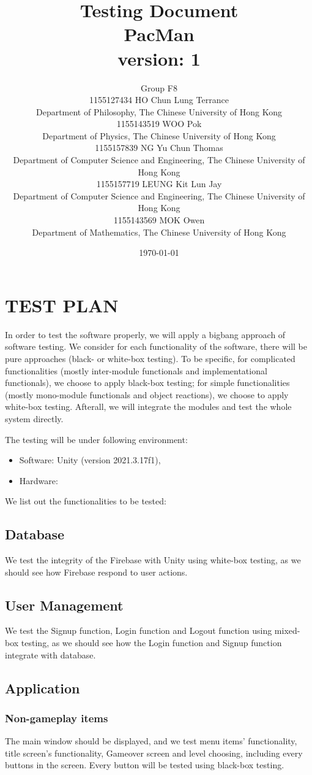 \documentclass[11pt]{article}
\title{Testing Document\\PacMan\\version: 1}
\author{Group F8\\1155127434 HO Chun Lung Terrance\\
Department of Philosophy, The Chinese University of Hong Kong\\1155143519 WOO Pok\\
Department of Physics, The Chinese University of Hong Kong\\1155157839 NG Yu Chun Thomas\\
Department of Computer Science and Engineering, The Chinese University of Hong Kong\\1155157719 LEUNG Kit Lun Jay\\
Department of Computer Science and Engineering, The Chinese University of Hong Kong\\1155143569 MOK Owen\\
Department of Mathematics, The Chinese University of Hong Kong}
\date{\today}
\begin{document}
    \maketitle
    \tableofcontents
    \newpage

    \section{TEST PLAN}
    In order to test the software properly, we will apply a bigbang approach of software testing. We consider for each functionality of the software, there will be pure approaches (black- or white-box testing). To be specific, for complicated functionalities (mostly inter-module functionals and implementational functionals), we choose to apply black-box testing; for simple functionalities (mostly mono-module functionals and object reactions), we choose to apply white-box testing. Afterall, we will integrate the modules and test the whole system directly.

    The testing will be under following environment:
    \begin{itemize}
        \item Software: Unity (version 2021.3.17f1),
        \item Hardware: 
    \end{itemize}

    We list out the functionalities to be tested:

    \subsection*{Database}
    We test the integrity of the Firebase with Unity using white-box testing, as we should see how Firebase respond to user actions.

    \subsection*{User Management}
    We test the Signup function, Login function and Logout function using mixed-box testing, as we should see how the Login function and Signup function integrate with database.

    \subsection*{Application}
    \subsubsection*{Non-gameplay items}
    The main window should be displayed, and we test menu items' functionality, title screen's functionality, Gameover screen and level choosing, including every buttons in the screen. Every button will be tested using black-box testing.
\end{document}
